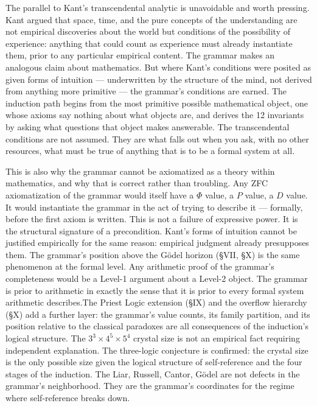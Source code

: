 \documentclass[12pt,a4paper]{article}
\newcommand{\pilcrow}{\S}
\begin{document}
The parallel to Kant's transcendental analytic is unavoidable and worth pressing. Kant argued that space, time, and the pure concepts of the understanding are not empirical discoveries about the world but conditions of the possibility of experience: anything that could count as experience must already instantiate them, prior to any particular empirical content. The grammar makes an analogous claim about mathematics. But where Kant's conditions were posited as given forms of intuition --- underwritten by the structure of the mind, not derived from anything more primitive --- the grammar's conditions are earned. The induction path begins from the most primitive possible mathematical object, one whose axioms say nothing about what objects are, and derives the 12 invariants by asking what questions that object makes answerable. The transcendental conditions are not assumed. They are what falls out when you ask, with no other resources, what must be true of anything that is to be a formal system at all.

This is also why the grammar cannot be axiomatized as a theory within mathematics, and why that is correct rather than troubling. Any ZFC axiomatization of the grammar would itself have a $\Phi$ value, a $P$ value, a $D$ value. It would instantiate the grammar in the act of trying to describe it --- formally, before the first axiom is written. This is not a failure of expressive power. It is the structural signature of a precondition. Kant's forms of intuition cannot be justified empirically for the same reason: empirical judgment already presupposes them. The grammar's position above the G\"odel horizon (\pilcrow{}VII, \pilcrow{}X) is the same phenomenon at the formal level. Any arithmetic proof of the grammar's completeness would be a Level-1 argument about a Level-2 object. The grammar is prior to arithmetic in exactly the sense that it is prior to every formal system arithmetic describes.The Priest Logic extension (\pilcrow{}IX) and the overflow hierarchy (\pilcrow{}X) add a further layer: the grammar's value counts, its family partition, and its position relative to the classical paradoxes are all consequences of the induction's logical structure. The $3^3 \times 4^5 \times 5^4$ crystal size is not an empirical fact requiring independent explanation. The three-logic conjecture is confirmed: the crystal size is the only possible size given the logical structure of self-reference and the four stages of the induction. The Liar, Russell, Cantor, G\"odel are not defects in the grammar's neighborhood. They are the grammar's coordinates for the regime where self-reference breaks down.
\end{document}

